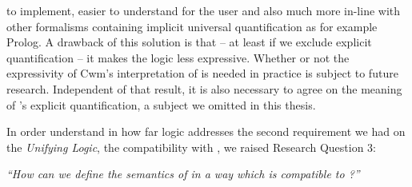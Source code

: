 to implement, easier to understand for the user and also much more in-line with other formalisms containing implicit universal quantification as for example Prolog. 
A drawback of this solution is that -- at least if we exclude explicit quantification -- it makes the logic less expressive. Whether or not the expressivity of Cwm's interpretation of 
\nthree is needed in practice is subject to future research. Independent of that result, it is also necessary to agree on the meaning of \nthree's explicit quantification, 
a subject we omitted  in this thesis. 


In order understand in how far \nthree logic addresses the second requirement we had on the \emph{Unifying Logic}, the compatibility with \rdf, we raised Research Question 3:

\emph{``How can we define the semantics of \nthreelogic in a way which is compatible to \rdf?''}

